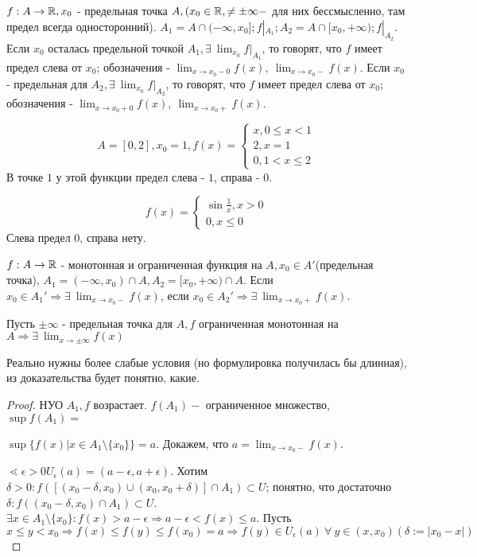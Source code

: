 \documentclass[12pt]{report}
\begin{document}
\begin{defn}
$f: A \to \mathbb{R}, x_0$ - предельная точка $A, (x_0 \in \mathbb{R}, \neq \pm \infty - $ для них бессмысленно, там предел всегда односторонний). $A_1 = A \cap (- \infty, x_0]; f|_{A_1}; A_2 = A \cap [x_0, + \infty); f|_{A_2}$. Если $x_0$ осталась предельной точкой $A_1, \exists ~\lim_{x_0}{f|_{A_1}}$, то говорят, что $f$ имеет предел слева от $x_0$; обозначения - $\lim_{x \to x_0 - 0}{f(x)}, ~\lim_{x \to x_0-}{f(x)}$. Если $x_0$ - предельная для $A_2, \exists ~\lim_{x_0}{f|_{A_2}}$, то говорят, что $f$ имеет предел слева от $x_0$; обозначения - $\lim_{x \to x_0 + 0}{f(x)}, ~\lim_{x \to x_0+}{f(x)}$.
\end{defn}

\begin{ex}
$$A = [0, 2], x_0 = 1, f(x) = 
\left\{
\begin{matrix}
x, 0 \le x < 1\\
2, x = 1\\
0, 1 < x \le 2
\end{matrix}\right.
$$
В точке $1$ у этой функции предел слева - $1$, справа - $0$.

$$f(x) = 
\left\{
\begin{matrix}
\sin{\frac{1}{x}}, x > 0\\
0, x \le 0
\end{matrix}\right.
$$
Слева предел $0$, справа нету.
\end{ex}

\begin{thm}
$f: A \to \mathbb{R}$ - монотонная и ограниченная функция на $A, x_0 \in A'$(предельная точка), $A_1 = (-\infty, x_0) \cap A, A_2 = [x_0, +\infty) \cap A$. Если $x_0 \in A_1' \Rightarrow \exists ~\lim_{x \to x_0-}{f(x)}$, если $x_0 \in A_2' \Rightarrow \exists ~\lim_{x \to x_0+}{f(x)}$.

Пусть $\pm\infty$ - предельная точка для $A, f$ ограниченная монотонная на $A \Rightarrow \exists ~\lim_{x \to \pm\infty}{f(x)}$
\end{thm}
\begin{note}
Реально нужны более слабые условия (но формулировка получилась бы длинная), из доказательства будет понятно, какие.
\end{note}
\begin{proof}
НУО $A_1, f$ возрастает. $f(A_1) - $ ограниченное множество, $\sup{f(A_1)} = $ 

$\sup{\{f(x)| x \in A_1\setminus\{x_0\}\}} = a$. Докажем, что $a = \lim_{x \to x_0-}{f(x)}$.

$\lessdot \epsilon > 0 U_\epsilon(a) = (a - \epsilon, a + \epsilon)$. Хотим $\delta > 0: f([(x_0 - \delta, x_0) \cup (x_0, x_0 + \delta)] \cap A_1) \subset U$; понятно, что достаточно $\delta : f((x_0 - \delta, x_0) \cap A_1) \subset U$. $\exists x \in A_1\setminus\{x_0\}: f(x) > a - \epsilon \Rightarrow a - \epsilon < f(x) \le a$. Пусть $x \le y < x_0 \Rightarrow f(x) \le f(y) \le f(x_0) = a \Rightarrow f(y) \in U_{\epsilon}(a) ~\forall ~y \in (x, x_0) (\delta := |x_0 - x|)$
\end{proof}
\end{document}

